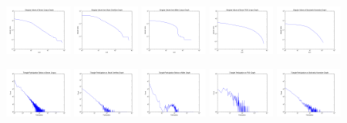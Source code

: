 \documentclass[12pt]{article}
\begin{document}
\begin{figure}
  \includegraphics[width=0.19\textwidth]{singval_loglog}
  \includegraphics[width=0.19\textwidth]{overflow_singval_loglog}
  \includegraphics[width=0.19\textwidth]{miller_singval_loglog}
  \includegraphics[width=0.19\textwidth]{pos_singval_loglog}
  \includegraphics[width=0.19\textwidth]{kron_singval_loglog}
  
  \includegraphics[width=0.19\textwidth]{triads}
  \includegraphics[width=0.19\textwidth]{overflow_triads}
  \includegraphics[width=0.19\textwidth]{miller_triads}
  \includegraphics[width=0.19\textwidth]{pos_triads}
  \includegraphics[width=0.19\textwidth]{kron_triads}


\end{figure}
\end{document}
